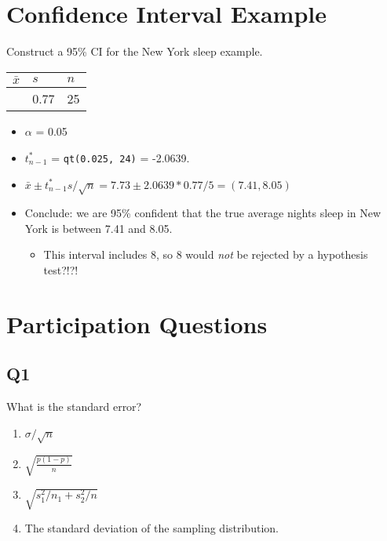 \documentclass[
  letterpaper,
  DIV=11,
  numbers=noendperiod]{scrreprt}
\providecommand{\tightlist}{%
  \setlength{\itemsep}{0pt}\setlength{\parskip}{0pt}}\usepackage{longtable,booktabs,array}
\def\pause{}
\def\lspace{}
\def\pspace{}
\begin{document}
\hypertarget{confidence-interval-example}{%
\section{Confidence Interval
Example}\label{confidence-interval-example}}

Construct a 95\% CI for the New York sleep example.

\begin{longtable}[]{@{}lll@{}}
\toprule\noalign{}
\(\bar x\) & \(s\) & \(n\) \\
\midrule\noalign{}
\endhead
\bottomrule\noalign{}
\endlastfoot
7.73 & 0.77 & 25 \\
\end{longtable}

\begin{itemize}
\tightlist
\item
  \(\alpha\) = \pause 0.05\lspace
\item
  \(t^*_{n-1}\) = \pause \texttt{qt(0.025,\ 24)} = -2.0639.\lspace
\item
  \(\bar x \pm t^*_{n-1}s/\sqrt{n} = 7.73 \pm 2.0639*0.77/5 = (7.41, 8.05)\)\lspace
\item
  Conclude: we are 95\% confident that the true average nights sleep in
  New York is between 7.41 and 8.05.

  \begin{itemize}
  \tightlist
  \item
    This interval includes 8, so 8 would \emph{not} be rejected by a
    hypothesis test?!?!
  \end{itemize}
\end{itemize}

\hypertarget{participation-questions-3}{%
\section{Participation Questions}\label{participation-questions-3}}

\hypertarget{q1-2}{%
\subsection{Q1}\label{q1-2}}

What is the standard error?

\pspace

\begin{enumerate}
\def\labelenumi{\arabic{enumi}.}
\tightlist
\item
  \(\sigma/\sqrt{n}\)
\item
  \(\sqrt{\frac{p(1-p)}{n}}\)
\item
  \(\sqrt{s_1^2/n_1 + s_2^2/n}\)
\item
  The standard deviation of the sampling distribution.
\end{enumerate}
\end{document}

